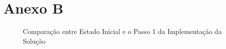 \chapter{Anexo B} 	
\label{appendix-b}
\begin{landscape}

\begin{figure}[H]
    \centering
    \qquad
    \caption{Comparação entre Estado Inicial e o Passo 1 da Implementação da Solução}%
\end{figure}


\end{landscape}
